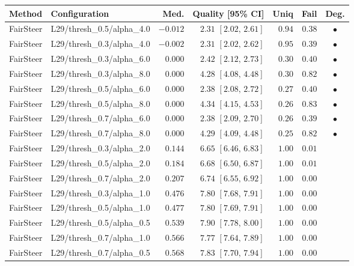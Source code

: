 \begin{table}[t]
\centering\small
\begin{tabular}{llrrrrc}
\toprule
Method & Configuration & Med. & Quality \scriptsize[95\% CI] & Uniq & Fail & Deg. \\
\midrule
FairSteer & L29/thresh\_0.5/alpha\_4.0 & $-0.012$ & $2.31$ \scriptsize$[2.02,\,2.61]$ & $0.94$ & $0.38$ & $\bullet$ \\
FairSteer & L29/thresh\_0.3/alpha\_4.0 & $-0.002$ & $2.31$ \scriptsize$[2.02,\,2.62]$ & $0.95$ & $0.39$ & $\bullet$ \\
FairSteer & L29/thresh\_0.3/alpha\_6.0 & $0.000$ & $2.42$ \scriptsize$[2.12,\,2.73]$ & $0.30$ & $0.40$ & $\bullet$ \\
FairSteer & L29/thresh\_0.3/alpha\_8.0 & $0.000$ & $4.28$ \scriptsize$[4.08,\,4.48]$ & $0.30$ & $0.82$ & $\bullet$ \\
FairSteer & L29/thresh\_0.5/alpha\_6.0 & $0.000$ & $2.38$ \scriptsize$[2.08,\,2.72]$ & $0.27$ & $0.40$ & $\bullet$ \\
FairSteer & L29/thresh\_0.5/alpha\_8.0 & $0.000$ & $4.34$ \scriptsize$[4.15,\,4.53]$ & $0.26$ & $0.83$ & $\bullet$ \\
FairSteer & L29/thresh\_0.7/alpha\_6.0 & $0.000$ & $2.38$ \scriptsize$[2.09,\,2.70]$ & $0.26$ & $0.39$ & $\bullet$ \\
FairSteer & L29/thresh\_0.7/alpha\_8.0 & $0.000$ & $4.29$ \scriptsize$[4.09,\,4.48]$ & $0.25$ & $0.82$ & $\bullet$ \\
FairSteer & L29/thresh\_0.3/alpha\_2.0 & $0.144$ & $6.65$ \scriptsize$[6.46,\,6.83]$ & $1.00$ & $0.01$ &  \\
FairSteer & L29/thresh\_0.5/alpha\_2.0 & $0.184$ & $6.68$ \scriptsize$[6.50,\,6.87]$ & $1.00$ & $0.01$ &  \\
FairSteer & L29/thresh\_0.7/alpha\_2.0 & $0.207$ & $6.74$ \scriptsize$[6.55,\,6.92]$ & $1.00$ & $0.00$ &  \\
FairSteer & L29/thresh\_0.3/alpha\_1.0 & $0.476$ & $7.80$ \scriptsize$[7.68,\,7.91]$ & $1.00$ & $0.00$ &  \\
FairSteer & L29/thresh\_0.5/alpha\_1.0 & $0.477$ & $7.80$ \scriptsize$[7.69,\,7.91]$ & $1.00$ & $0.00$ &  \\
FairSteer & L29/thresh\_0.5/alpha\_0.5 & $0.539$ & $7.90$ \scriptsize$[7.78,\,8.00]$ & $1.00$ & $0.00$ &  \\
FairSteer & L29/thresh\_0.7/alpha\_1.0 & $0.566$ & $7.77$ \scriptsize$[7.64,\,7.89]$ & $1.00$ & $0.00$ &  \\
FairSteer & L29/thresh\_0.7/alpha\_0.5 & $0.568$ & $7.83$ \scriptsize$[7.70,\,7.94]$ & $1.00$ & $0.00$ &  \\

\end{tabular}
\end{table}
